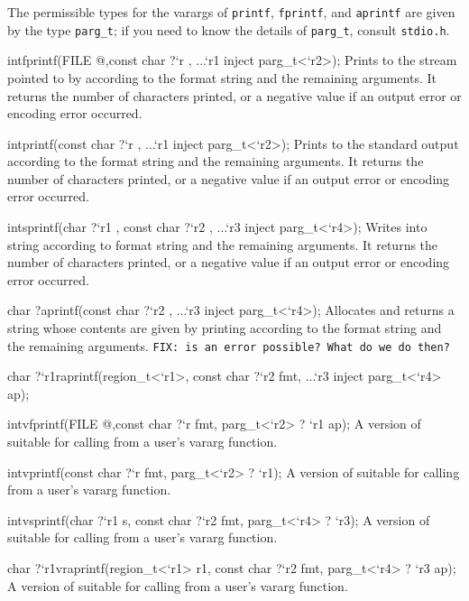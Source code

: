 The permissible types for the varargs of \texttt{printf},
\texttt{fprintf}, and \texttt{aprintf} are given by the type
\texttt{parg_t}; if you need to know the details of \texttt{parg_t},
consult \texttt{stdio.h}.

\begin{defun2}{int}{fprintf}{(FILE @,const char {?}`r , ...`r1 inject parg_t<`r2>);}
  Prints to the stream pointed to by  according to the format
  string  and the remaining arguments.  It returns the number
  of characters printed, or a negative value if an output error or
  encoding error occurred.
\end{defun2}
\begin{defun2}{int}{printf}{(const char {?}`r , ...`r1 inject parg_t<`r2>);}
  Prints to the standard output according to the format string 
  and the remaining arguments.  It returns the number of characters
  printed, or a negative value if an output error or encoding error
  occurred.
\end{defun2}
\begin{defun2}{int}{sprintf}{(char {?}`r1 , const char {?}`r2 , ...`r3 inject parg_t<`r4>);}
  Writes into string  according to format string  and
  the remaining arguments.  It returns the number of characters
  printed, or a negative value if an output error or encoding error
  occurred.
\end{defun2}
\begin{defun2}{char ?}{aprintf(const char {?}`r2 , ...`r3 inject parg_t<`r4>);}
  Allocates and returns a string whose contents are given by printing
  according to the format string  and the remaining arguments.
  \texttt{FIX: is an error possible?  What do we do then?}
\end{defun2}
\begin{defun2}{char {?}`r1}{raprintf}{(region_t<`r1>, const char {?}`r2 fmt, ...`r3 inject parg_t<`r4> ap);}
\end{defun2}

\begin{defun2}{int}{vfprintf}{(FILE @,const char {?}`r fmt, parg_t<`r2> ? `r1 ap);}
  A version of  suitable for calling from a user's
  vararg function.
\end{defun2}
\begin{defun2}{int}{vprintf}{(const char {?}`r fmt, parg_t<`r2> ? `r1);}
  A version of  suitable for calling from a user's
  vararg function.
\end{defun2}
\begin{defun2}{int}{vsprintf}{(char {?}`r1 s, const char {?}`r2 fmt, parg_t<`r4> ? `r3);}
  A version of  suitable for calling from a user's
  vararg function.
\end{defun2}
\begin{defun2}{char {?}`r1}{vraprintf}{(region_t<`r1> r1, const char {?}`r2 fmt, parg_t<`r4> ? `r3 ap);}
  A version of  suitable for calling from a user's
  vararg function.
\end{defun2}

